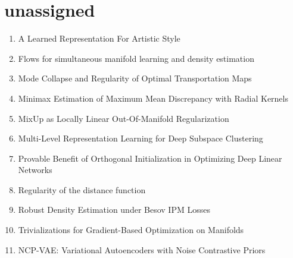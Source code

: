 \documentclass[acmlarge]{acmart}
\begin{document}
\section{unassigned}
\begin{enumerate}
	\item A Learned Representation For Artistic Style \cite{Dumoulin2017ALR} 

	\item Flows for simultaneous manifold learning and density estimation \cite{Brehmer2020FlowsFS} 

	\item Mode Collapse and Regularity of Optimal Transportation Maps \cite{Lei2019ModeCA} 

	\item Minimax Estimation of Maximum Mean Discrepancy with Radial Kernels \cite{Tolstikhin2016MinimaxEO} 

	\item MixUp as Locally Linear Out-Of-Manifold Regularization \cite{Guo2019MixUpAL} 

	\item Multi-Level Representation Learning for Deep Subspace Clustering \cite{Kheirandishfard2020MultiLevelRL} 

	\item Provable Benefit of Orthogonal Initialization in Optimizing Deep Linear Networks \cite{Hu2020ProvableBO} 

	\item Regularity of the distance function \cite{Foote1984RegularityOT} 

	\item Robust Density Estimation under Besov IPM Losses \cite{Uppal2020RobustDE} 

	\item Trivializations for Gradient-Based Optimization on Manifolds \cite{LezcanoCasado2019TrivializationsFG} 

	\item NCP-VAE: Variational Autoencoders with Noise Contrastive Priors \cite{Aneja2020NCPVAEVA} 

\end{enumerate}
\end{document}
